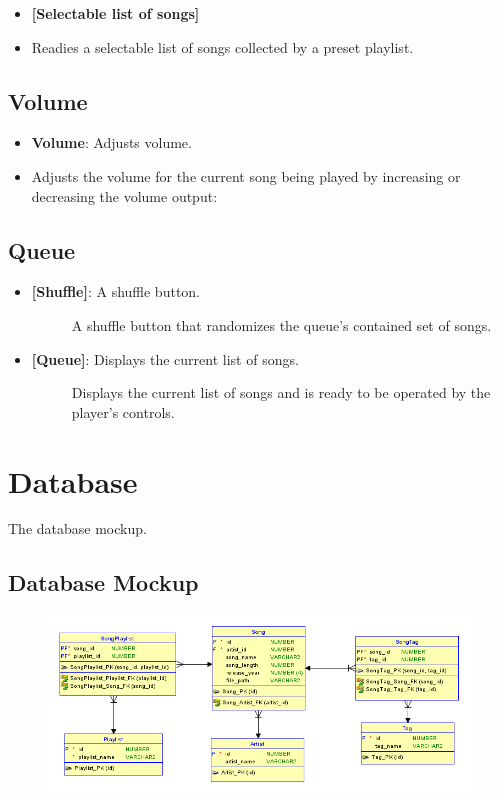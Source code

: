 \documentclass{article}
\begin{document}
\begin{itemize}
    \item \textbf{[Selectable list of songs]}
        \item[] Readies a selectable list of songs collected by a preset playlist.
\end{itemize}

\subsection{Volume}

\begin{itemize}
    \item \textbf{Volume}: Adjusts volume.
        \item[] Adjusts the volume for the current song being played by increasing or decreasing the volume output:  
\end{itemize}

\subsection{Queue}

\begin{itemize}
    \item \textbf{[Shuffle]}: A shuffle button.
    \begin{description}
        \item[] A shuffle button that randomizes the queue's contained set of songs.
    \end{description}
    \item \textbf{[Queue]}: Displays the current list of songs.
        \begin{description}
        \item[] Displays the current list of songs and is ready to be operated by the player's controls.
        \end{description}
\end{itemize}

\clearpage

\section{Database}
\quad The database mockup.

\subsection{Database Mockup}

\begin{figure}[h]
\includegraphics[width=18cm]{Images/AMP_DB_Mockup.PNG}
\end{figure}
\end{document}
